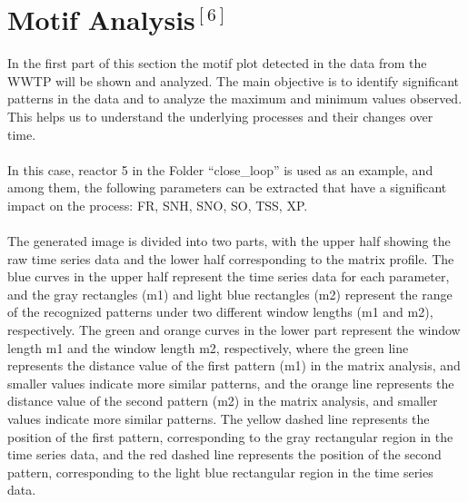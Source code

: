 \documentclass[]{iat}
\begin{document}
\section{Motif Analysis$^{[6]}$}
In the first part of this section the motif plot detected in the data from the WWTP will be shown and analyzed. The main objective is to identify significant patterns in the data and to analyze the maximum and minimum values observed. This helps us to understand the underlying processes and their changes over time.\\
\\
In this case, reactor 5 in the Folder “close\_loop” is used as an example, and among them, the following parameters can be extracted that have a significant impact on the process: FR, SNH, SNO, SO, TSS, XP.\\
\\
The generated image is divided into two parts, with the upper half showing the raw time series data and the lower half corresponding to the matrix profile. The blue curves in the upper half represent the time series data for each parameter, and the gray rectangles (m1) and light blue rectangles (m2) represent the range of the recognized patterns under two different window lengths (m1 and m2), respectively. The green and orange curves in the lower part represent the window length m1 and the window length m2, respectively, where the green line represents the distance value of the first pattern (m1) in the matrix analysis, and smaller values indicate more similar patterns, and the orange line represents the distance value of the second pattern (m2) in the matrix analysis, and smaller values indicate more similar patterns. The yellow dashed line represents the position of the first pattern, corresponding to the gray rectangular region in the time series data, and the red dashed line represents the position of the second pattern, corresponding to the light blue rectangular region in the time series data.
\end{document}

